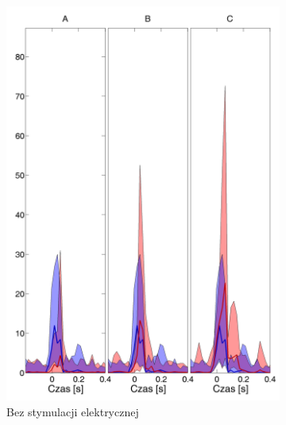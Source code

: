 \documentclass{pracamgr}
\begin{document}
	\begin{figure}[h]
		\begin{subfigure}{.5\textwidth}
			\centering
			\includegraphics[width=1.\linewidth]{kontrola15_10-30_z_CxC8_do_SC42.png}
			\caption{Bez stymulacji elektrycznej}
			\label{rys:10_30_kon_CxC_SC}
		\end{subfigure}%
		\begin{subfigure}{.5\textwidth}
			\centering

\end{subfigure}
\end{figure}
\end{document}
